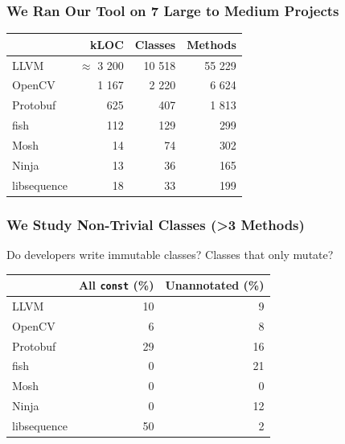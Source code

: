 \documentclass[aspectratio=169]{beamer}
\begin{document}
  \begin{frame}
    \frametitle{We Ran Our Tool on 7 Large to Medium Projects}

    \begin{center}\begin{tabular}{l r r r}
                  & kLOC            & Classes & Methods \\
      \hline
      LLVM        & $\approx$ 3 200 &  10 518 &  55 229 \\
      OpenCV      &           1 167 &   2 220 &   6 624 \\
      Protobuf    &             625 &     407 &   1 813 \\
      fish        &             112 &     129 &     299 \\
      Mosh        &              14 &      74 &     302 \\
      Ninja       &              13 &      36 &     165 \\
      libsequence &              18 &      33 &     199 \\
    \end{tabular}\end{center}
  \end{frame}

  \begin{frame}
    \frametitle{We Study Non-Trivial Classes (>3 Methods)}

    Do developers write immutable classes? Classes that only mutate?

    \vspace{2em}

    \begin{center}\begin{tabular}{l r r}
                  & All \texttt{const} (\%) & Unannotated (\%) \\
      \hline
      LLVM        & 10 &  9 \\
      OpenCV      &  6 &  8 \\
      Protobuf    & 29 & 16 \\
      fish        &  0 & 21 \\
      Mosh        &  0 &  0 \\
      Ninja       &  0 & 12 \\
      libsequence & 50 &  2 \\
    \end{tabular}\end{center}
  \end{frame}
\end{document}
